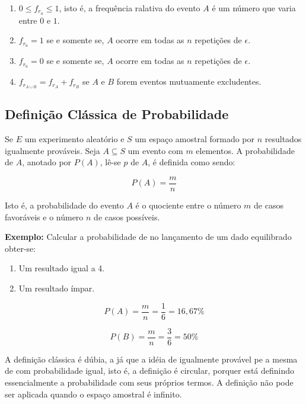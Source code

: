 \begin{enumerate}
    \item $0 \leqslant f_{r_{a}}  \leqslant 1$, isto é, a frequência ralativa do evento $A$ é um número que varia entre $0$ e $1$.
    \item $f_{r_{a}}= 1$ se e somente se, $A$ ocorre em todas as $n$ repetições de $\epsilon$.
    \item $f_{r_{a}}= 0$ se e somente se, $A$ ocorre em todas as $n$ repetições de $\epsilon$.
    \item $f_{r_{A \cup B}}  = f_{r_{A}} + f_{r_{B}}$ se $A$ e $B$ forem eventos mutuamente excludentes.
\end{enumerate}
 
 
 
 
 
\subsection{Definição Clássica de Probabilidade}
 
\inic Se $E$ um experimento aleatório e $S$ um espaço amostral formado por $n$ resultados igualmente prováveis. Seja $A \subseteq S$ um evento com $m$ elementos. A probabilidade de $A$, anotado por $P(A)$, lê-se $p$ de $A$, é definida como sendo:
  
\begin{equation}
     P(A)= \frac{m}{n}
\end{equation}
  
\inic Isto é, a probabilidade do evento $A$ é o quociente entre o número $m$ de casos favoráveis e o número $n$ de casos possíveis.\vskip0.3cm


\textbf{Exemplo:} Calcular a probabilidade de no lançamento de um
dado equilibrado obter-se:

\begin{enumerate}
    \item Um resultado igual a 4.
    \item Um resultado ímpar.
\end{enumerate}

$$
P(A)= \frac{m}{n}=\frac{1}{6}=16,67\%
$$

$$
P(B)= \frac{m}{n}=\frac{3}{6}=50\%
$$





\inic A definição clássica é dúbia, a já que a idéia de igualmente provável pe a mesma de com probabilidade igual, isto é, a definição é circular, porquer está definindo essencialmente a probabilidade com seus próprios termos. A definição não pode ser aplicada quando o espaço amostral é infinito.


